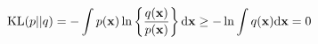 $${\rm KL}(p||q) = - \int p({\bf x})\ln \left\{\frac{q({\bf x})}{p({\bf x})}\right\} {\rm d}{\bf x} \ge - \ln \int q({\bf x}){\rm d}{\bf x} = 0 $$
